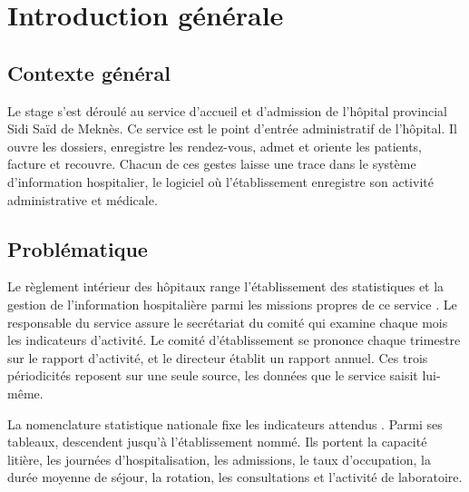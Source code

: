 
\chapter*{Introduction générale}

\section*{Contexte général}

Le stage s'est déroulé au service d'accueil et d'admission de l'hôpital provincial Sidi Saïd de
Meknès. Ce service est le point d'entrée administratif de l'hôpital. Il ouvre les dossiers,
enregistre les rendez-vous, admet et oriente les patients, facture et recouvre. Chacun de ces gestes
laisse une trace dans le système d'information hospitalier, le logiciel où l'établissement enregistre
son activité administrative et médicale.

\section*{Problématique}

Le règlement intérieur des hôpitaux range l'établissement des statistiques et la gestion de
l'information hospitalière parmi les missions propres de ce service \cite{s27}. Le responsable du
service assure le secrétariat du comité qui examine chaque mois les indicateurs d'activité. Le
comité d'établissement se prononce chaque trimestre sur le rapport d'activité, et le directeur
établit un rapport annuel. Ces trois périodicités reposent sur une seule source, les données que
le service saisit lui-même.

La nomenclature statistique nationale fixe les indicateurs attendus \cite{s30}. Parmi ses tableaux,
 descendent jusqu'à l'établissement nommé. Ils portent la capacité
litière, les journées d'hospitalisation, les admissions, le taux d'occupation, la durée moyenne de
séjour, la rotation, les consultations et l'activité de laboratoire.

